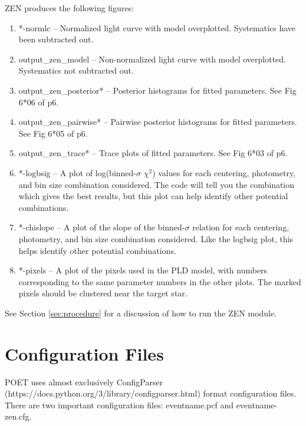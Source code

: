 \documentclass[letterpaper,12pt]{article}
\begin{document}
ZEN produces the following figures:

\begin{enumerate}
  \item *-normlc -- Normalized light curve with model
    overplotted. Systematics have been subtracted out.

  \item output\_zen\_model -- Non-normalized light curve with model
    overplotted. Systematics not subtracted out.

  \item output\_zen\_posterior* -- Posterior histograms for fitted
    parameters. See Fig 6*06 of p6.

  \item output\_zen\_pairwise* -- Pairwise posterior histograms for
    fitted parameters.  See Fig 6*05 of p6.

  \item output\_zen\_trace* -- Trace plots of fitted parameters. See
    Fig 6*03 of p6.

  \item *-logbsig -- A plot of log(binned-$\sigma$ $\chi^2$) values
    for each centering, photometry, and bin size combination
    considered. The code will tell you the combination which gives the
    best results, but this plot can help identify other potential
    combinations.

  \item *-chislope -- A plot of the slope of the binned-$\sigma$
    relation for each centering, photometry, and bin size combination
    considered. Like the logbsig plot, this helps identify other
    potential combinations.

  \item *-pixels -- A plot of the pixels used in the PLD model, with
    numbers corresponding to the same parameter numbers in the other
    plots. The marked pixels should be clustered near the target star.

\end{enumerate}

See Section \ref{sec:procedure} for a discussion of how to run the
ZEN module.

\section{Configuration Files}
POET uses almost exclusively ConfigParser
(https://docs.python.org/3/library/configparser.html) format
configuration files. There are two important configuration files:
eventname.pcf and eventname-zen.cfg.
\end{document}
